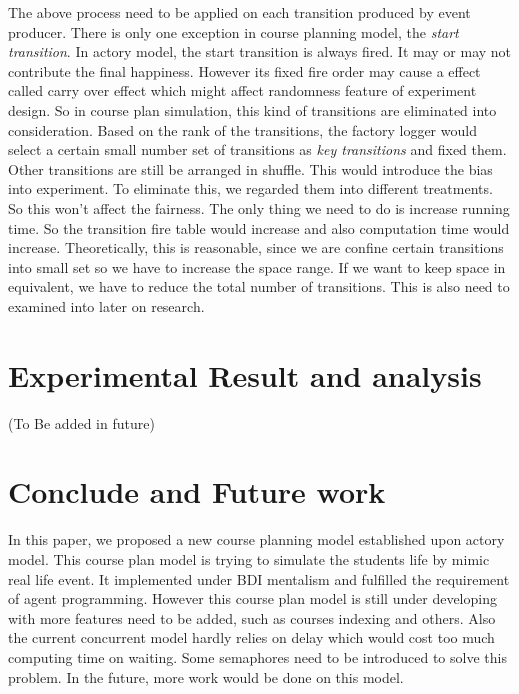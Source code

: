 \documentclass{sig-alternate}
\begin{document}
The above process need to be applied on each transition produced by event producer.   There is only one exception in course planning model, the {\em start transition}. In actory model,  the start transition is always fired.  It may or may not contribute the final happiness. However its fixed fire order may cause a effect called carry over effect \cite{} which might affect randomness feature of experiment design. So in course plan simulation, this kind of transitions are eliminated into consideration.  Based on the rank of the transitions, the factory logger would select  a certain small number set of transitions as {\em key transitions} and fixed them.  Other transitions are still be arranged in shuffle.  This would introduce the bias into experiment. To eliminate this, we regarded them into different treatments.  So this won't affect the fairness. The only thing we need to do is increase running time.  So the transition fire table would increase and also computation time would increase.  Theoretically, this is reasonable, since we are confine certain transitions into small set so we have to increase the space range.  If we want to keep space in equivalent,  we have to reduce the total number of transitions.   This is also need to examined into later on research. 
\section{Experimental Result and analysis}

(To Be added in future)

\section{Conclude and Future work}
In this paper, we proposed a new course planning model established upon actory model.  This course plan model is trying to simulate the students life by mimic real life event.  It implemented under BDI mentalism and fulfilled the requirement of agent programming. However 
this course plan model is still under developing with more features need to be added, such as courses indexing and others.   Also the current concurrent model hardly relies on delay which would cost too much computing time on waiting. Some semaphores need to be introduced to solve this problem.  In the future, more work would be done on this model. 



\end{document}
